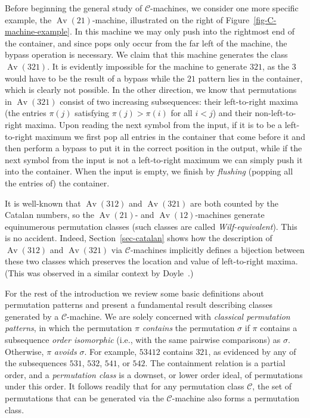 \documentclass[10pt]{article}
\theoremstyle{plain}
\theoremstyle{definition}
\newcommand{\Av}{\operatorname{Av}}
\newcommand{\C}{\mathcal{C}}
\begin{document}
Before beginning the general study of $\C$-machines, we consider one more specific example, the $\Av(21)$-machine, illustrated on the right of Figure~\ref{fig-C-machine-example}. In this machine we may only push into the rightmost end of the container, and since pops only occur from the far left of the machine, the bypass operation is necessary.  We claim that this machine generates the class $\Av(321)$. It is evidently impossible for the machine to generate $321$, as the $3$ would have to be the result of a bypass while the $21$ pattern lies in the container, which is clearly not possible. In the other direction, we know that permutations in $\Av(321)$ consist of two increasing subsequences: their left-to-right maxima (the entries $\pi(j)$ satisfying $\pi(j)>\pi(i)$ for all $i<j$) and their non-left-to-right maxima. Upon reading the next symbol from the input, if it is to be a left-to-right maximum we first pop all entries in the container that come before it and then perform a bypass to put it in the correct position in the output, while if the next symbol from the input is not a left-to-right maximum we can simply push it into the container. When the input is empty, we finish by \emph{flushing} (popping all the entries of) the container.

It is well-known that $\Av(312)$ and $\Av(321)$ are both counted by the Catalan numbers, so the $\Av(21)$- and $\Av(12)$-machines generate equinumerous permutation classes (such classes are called \emph{Wilf-equivalent}). This is no accident. Indeed, Section~\ref{sec-catalan} shows how the description of $\Av(312)$ and $\Av(321)$ via $\C$-machines implicitly defines a bijection between these two classes which preserves the location and value of left-to-right maxima. (This was observed in a similar context by Doyle~\cite{Doyle:Stackable-and-q:}.)

For the rest of the introduction we review some basic definitions about permutation patterns and present a fundamental result describing classes generated by a $\C$-machine. We are solely concerned with \emph{classical permutation patterns}, in which the permutation $\pi$ \emph{contains} the permutation $\sigma$ if $\pi$ contains a subsequence \emph{order isomorphic} (i.e., with the same pairwise comparisons) as $\sigma$. Otherwise, $\pi$ \emph{avoids} $\sigma$. For example, $53412$ contains $321$, as evidenced by any of the subsequences $531$, $532$, $541$, or $542$. The containment relation is a partial order, and a \emph{permutation class} is a downset, or lower order ideal, of permutations under this order. It follows readily that for any permutation class $\C$, the set of permutations that can be generated via the $\C$-machine also forms a permutation class.
\end{document}
